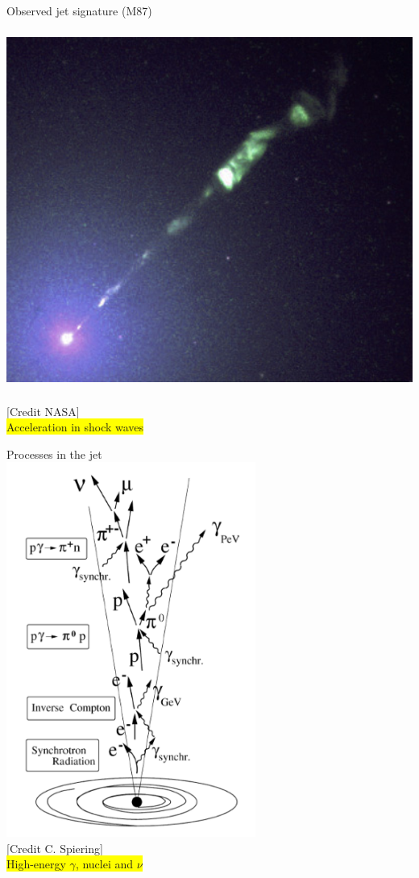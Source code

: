 \Tr
\twocolumn
\begin{center}
{\blue Observed jet signature} (M87)\\[2mm]
\includegraphics[keepaspectratio,height=12.5cm]{M87jet}\\
{\small [Credit NASA]}\\[2mm]
\colorbox{yellow}{Acceleration in shock waves}
\end{center}

\newpage

\begin{center}
{\blue Processes in the jet}\\[5mm]
\includegraphics[keepaspectratio,height=12.3cm]{jet}\\
{\small [Credit C. Spiering]}\\[2mm]
\colorbox{yellow}{High-energy $\gamma$, nuclei and $\nu$}
\end{center}

